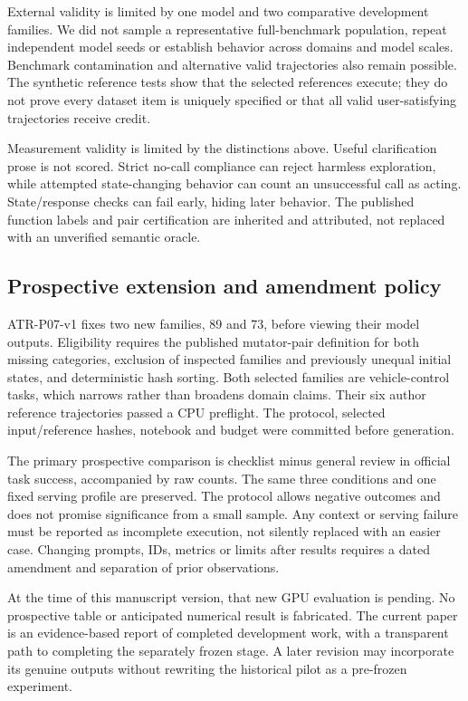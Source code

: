\documentclass[conference]{IEEEtran}
\begin{document}
External validity is limited by one model and two comparative development families. We did not sample a representative full-benchmark population, repeat independent model seeds or establish behavior across domains and model scales. Benchmark contamination and alternative valid trajectories also remain possible. The synthetic reference tests show that the selected references execute; they do not prove every dataset item is uniquely specified or that all valid user-satisfying trajectories receive credit.

Measurement validity is limited by the distinctions above. Useful clarification prose is not scored. Strict no-call compliance can reject harmless exploration, while attempted state-changing behavior can count an unsuccessful call as acting. State/response checks can fail early, hiding later behavior. The published function labels and pair certification are inherited and attributed, not replaced with an unverified semantic oracle.

\subsection{Prospective extension and amendment policy}
ATR-P07-v1 fixes two new families, 89 and 73, before viewing their model outputs. Eligibility requires the published mutator-pair definition for both missing categories, exclusion of inspected families and previously unequal initial states, and deterministic hash sorting. Both selected families are vehicle-control tasks, which narrows rather than broadens domain claims. Their six author reference trajectories passed a CPU preflight. The protocol, selected input/reference hashes, notebook and budget were committed before generation.

The primary prospective comparison is checklist minus general review in official task success, accompanied by raw counts. The same three conditions and one fixed serving profile are preserved. The protocol allows negative outcomes and does not promise significance from a small sample. Any context or serving failure must be reported as incomplete execution, not silently replaced with an easier case. Changing prompts, IDs, metrics or limits after results requires a dated amendment and separation of prior observations.

At the time of this manuscript version, that new GPU evaluation is pending. No prospective table or anticipated numerical result is fabricated. The current paper is an evidence-based report of completed development work, with a transparent path to completing the separately frozen stage. A later revision may incorporate its genuine outputs without rewriting the historical pilot as a pre-frozen experiment.
\end{document}
